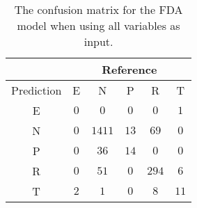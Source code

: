 \begin{table}[!ht]
	\centering
	\begin{tabular}{|c|c|c|c|c|c|}
		\hline
		 & \multicolumn{5}{|c|}{Reference} \\ \hline
		 Prediction & E & N & P & R & T \\ \hline
		 E & $0$ & $0$ & $0$ & $0$ & $1$ \\ \hline
		 N & $0$ & $1411$ & $13$ & $69$ & $0$ \\ \hline
		 P & $0$ & $36$ & $14$ & $0$ & $0$ \\ \hline
		 R & $0$ & $51$ & $0$ & $294$ & $6$ \\ \hline
		 T & $2$ & $1$ & $0$ & $8$ & $11$ \\ \hline
	\end{tabular}
	\caption{The confusion matrix for the FDA model when using all variables as input.}
	\label{tab:cm:all:fda}
\end{table}
